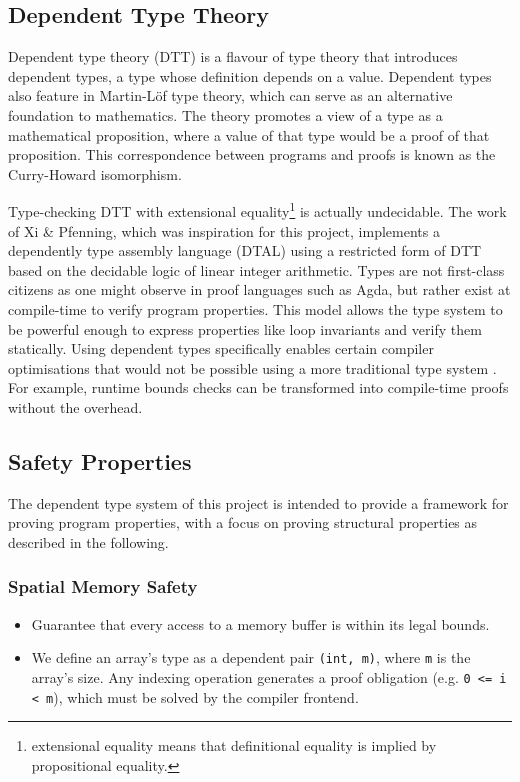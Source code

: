 \documentclass[a4paper, 12pt]{article}
\begin{document}
\subsection{Dependent Type Theory}

Dependent type theory (DTT) is a flavour of type theory that introduces dependent types, a type whose definition depends on a value. Dependent types also feature in Martin-L{\"o}f type theory, which can serve as an alternative foundation to mathematics. The theory promotes a view of a type as a mathematical proposition, where a value of that type would be a proof of that proposition. This correspondence between programs and proofs is known as the Curry-Howard isomorphism.

Type-checking DTT with extensional equality\footnote{extensional equality means that definitional equality is implied by propositional equality.} is actually undecidable. The work of Xi \& Pfenning, which was inspiration for this project, implements a dependently type assembly language (DTAL) using a restricted form of DTT based on the decidable logic of linear integer arithmetic. Types are not first-class citizens as one might observe in proof languages such as Agda, but rather exist at compile-time to verify program properties. This model allows the type system to be powerful enough to express properties like loop invariants and verify them statically. Using dependent types specifically enables certain compiler optimisations that would not be possible using a more traditional type system \cite{tal}. For example, runtime bounds checks can be transformed into compile-time proofs without the overhead.


\subsection{Safety Properties}

The dependent type system of this project is intended to provide a framework for proving program properties, with a focus on proving structural properties as described in the following.

\subsubsection*{Spatial Memory Safety}
\begin{itemize}
  \item Guarantee that every access to a memory buffer is within its legal bounds.
  \item We define an array's type as a dependent pair \texttt{(int, m)}, where \texttt{m} is the array's size. Any indexing operation generates a proof obligation (e.g. \texttt{0 <= i < m}), which must be solved by the compiler frontend.
\end{itemize}
\end{document}
